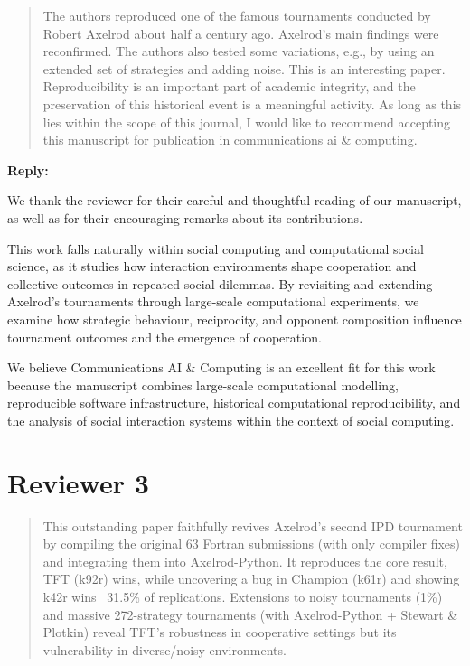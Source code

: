 \documentclass[11pt]{article}
\newcommand{\reply}{
\vspace{0.25em}
{\color{ForestGreen}\textbf{Reply:}}
}
\newenvironment{reviewercomment}
{
\vspace{0.5em}
\begin{quote}
\color{NavyBlue}
}
{
\end{quote}
}
\begin{document}
\begin{reviewercomment}
The authors reproduced one of the famous tournaments conducted by Robert Axelrod
about half a century ago. Axelrod's main findings were reconfirmed. The authors
also tested some variations, e.g., by using an extended set of strategies and
adding noise. This is an interesting paper. Reproducibility is an important part
of academic integrity, and the preservation of this historical event is a
meaningful activity. As long as this lies within the scope of this journal, I
would like to recommend accepting this manuscript for publication in
communications ai \& computing.
\end{reviewercomment}

\reply

We thank the reviewer for their careful and thoughtful reading of our
manuscript, as well as for their encouraging remarks about its contributions.

This work falls naturally within social computing and computational social
science, as it studies how interaction environments shape cooperation and
collective outcomes in repeated social dilemmas. By revisiting and extending
Axelrod's tournaments through large-scale computational experiments, we examine
how strategic behaviour, reciprocity, and opponent composition influence
tournament outcomes and the emergence of cooperation.

We believe Communications AI \& Computing is an excellent fit for this work
because the manuscript combines large-scale computational modelling,
reproducible software infrastructure, historical computational reproducibility,
and the analysis of social interaction systems within the context of social
computing.


\section*{Reviewer 3}

\begin{reviewercomment}
This outstanding paper faithfully revives Axelrod's second IPD tournament by
compiling the original 63 Fortran submissions (with only compiler fixes) and
integrating them into Axelrod-Python. It reproduces the core result, TFT (k92r)
wins, while uncovering a bug in Champion (k61r) and showing k42r wins ~31.5\% of
replications. Extensions to noisy tournaments (1\%) and massive 272-strategy
tournaments (with Axelrod-Python + Stewart \& Plotkin) reveal TFT's robustness in
cooperative settings but its vulnerability in diverse/noisy environments. 
\end{reviewercomment}
\end{document}
